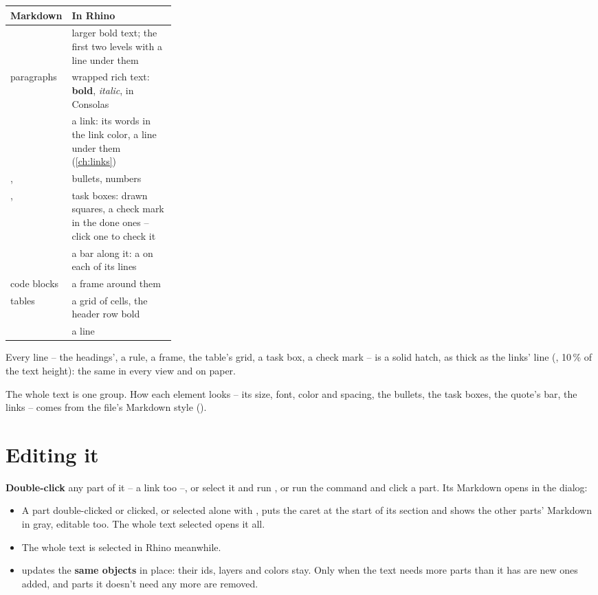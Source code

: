 \begin{xltabular}{\linewidth}{@{}P{0.28\linewidth}L@{}}
\toprule
\textsf{\textbf{Markdown}} & \textsf{\textbf{In Rhino}} \\ \midrule
{}           & larger bold text; the first two levels with a line under them \\
paragraphs                  & wrapped rich text: \textbf{bold}, \emph{italic},  in Consolas \\
       & a link: its words in the link color, a line under them (\cref{ch:links}) \\
,  & bullets, numbers \\
,  & task boxes: drawn squares, a check mark in the done ones -- click one to check it \\
              & a bar along it: a \code{|} on each of its lines \\
code blocks                 & a frame around them \\
tables                      & a grid of cells, the header row bold \\
\code{---}                  & a line \\
\bottomrule
\end{xltabular}

Every line -- the headings', a rule, a frame, the table's grid, a task box, a check mark -- is a solid hatch, as
thick as the links' line (, 10\,\% of the text height): the same in every view and
on paper.

The whole text is one group. How each element looks -- its size, font, color and spacing, the bullets, the task
boxes, the quote's bar, the links -- comes from the file's Markdown style ().

\section{Editing it}\label{sec:mdedit}

\textbf{Double-click} any part of it -- a link too --, or select it and run , or run the command and
click a part. Its Markdown opens in the dialog:

\begin{itemize}
  \item A part double-clicked or clicked, or selected alone with , puts the caret at the start
        of its section and shows the other parts' Markdown in gray, editable too. The whole text selected opens it all.
  \item The whole text is selected in Rhino meanwhile.
  \item {} updates the \textbf{same objects} in place: their ids, layers and colors stay. Only when the text needs
        more parts than it has are new ones added, and parts it doesn't need any more are removed.
\end{itemize}

